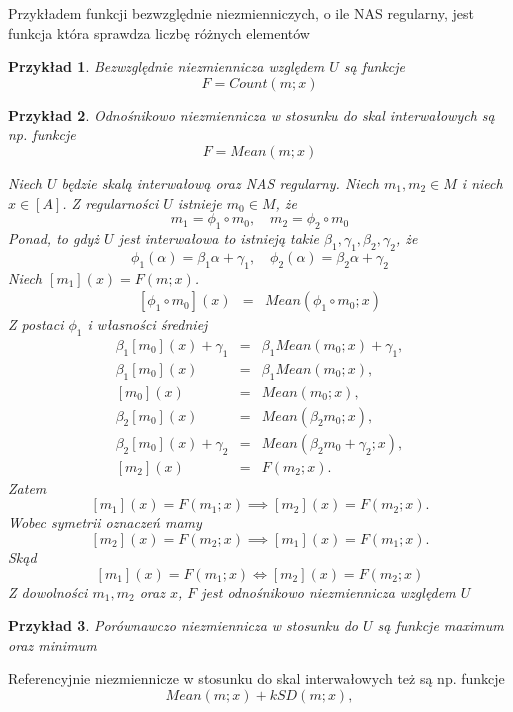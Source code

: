 \documentclass[12pt,a4paper]{report}
\newtheorem{przyklad}{Przykład}
\newcommand{\domkniecie}[1]{\left\lbrack{#1}\right\rbrack}
\begin{document}
Przykładem funkcji bezwzględnie niezmienniczych, o ile NAS regularny, jest funkcja która sprawdza liczbę różnych elementów
\begin{przyklad}
Bezwzględnie niezmiennicza względem $U$ są funkcje 
$$
F=Count(m;x)
$$
\end{przyklad}
\begin{przyklad}
Odnośnikowo niezmiennicza w stosunku do skal interwałowych są np. funkcje
$$
F=Mean(m;x)
$$ 

Niech $U$ będzie skalą interwałową oraz NAS regularny.
Niech $m_1,m_2\in M$ i niech $x\in \domkniecie{A}$. Z regularności $U$ istnieje $m_0 \in M$, że
$$
m_1 = \phi_1 \circ m_0, \quad m_2=\phi_2\circ m_0
$$
Ponad, to gdyż $U$ jest interwałowa to istnieją takie $\beta_{1}, \gamma_{1}, \beta_{2}, \gamma_{2}$, że
$$
\phi_1(\alpha)=\beta_1 \alpha + \gamma_1, \quad \phi_2(\alpha)=\beta_2 \alpha + \gamma_2
$$
Niech $\domkniecie{m_1}(x)=F(m;x)$.
\begin{eqnarray*}
\domkniecie{\phi_1\circ m_0}(x) & = & Mean(\phi_1\circ m_0;x) 
\end{eqnarray*}
Z postaci $\phi_{1}$ i własności średniej
\begin{eqnarray*}
\beta_1\domkniecie{m_0}(x)+ \gamma_1 & = & \beta_1 Mean(m_0;x) + \gamma_1, \\
\beta_1\domkniecie{m_0}(x) & = & \beta_1 Mean(m_0;x), \\
\domkniecie{m_0}(x) & = & Mean(m_0;x), \\
\beta_2\domkniecie{m_0}(x) & = & Mean(\beta_2 m_0;x), \\
\beta_2\domkniecie{m_0}(x) + \gamma_2 & = & Mean(\beta_2 m_0 + \gamma_2;x),  \\
\domkniecie{m_2}(x) & = & F(m_2;x) .
\end{eqnarray*}
Zatem
$$
\domkniecie{m_1}(x)=F(m_1;x) \implies \domkniecie{m_2}(x)=F(m_2;x).
$$
Wobec symetrii oznaczeń mamy
$$
\domkniecie{m_2}(x)=F(m_2;x) \implies \domkniecie{m_1}(x)=F(m_1;x).
$$
Skąd
$$
\domkniecie{m_1}(x)=F(m_1;x) \iff \domkniecie{m_2}(x)=F(m_2;x)
$$
Z dowolności $m_1,m_2$ oraz $x$, $F$ jest odnośnikowo niezmiennicza względem $U$
\end{przyklad}
\begin{przyklad}
Porównawczo niezmiennicza w stosunku do $U$ są funkcje maximum oraz minimum
\end{przyklad}
Referencyjnie niezmiennicze w stosunku do skal interwałowych też są np. funkcje
\begin{equation*}
Mean(m;x)+kSD(m;x),
\end{equation*}
\end{document}
